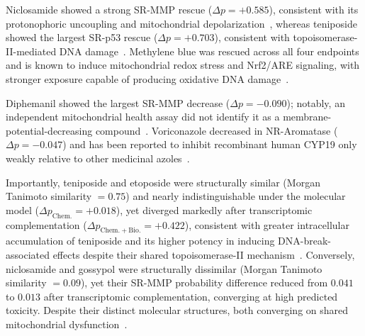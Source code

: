 \documentclass[11pt,a4paper]{article}
\begin{document}
Niclosamide showed a strong SR-MMP rescue (\(\Delta p=+0.585\)), consistent with its protonophoric uncoupling and mitochondrial depolarization~\cite{kumar2018niclosamide}, whereas teniposide showed the largest SR-p53 rescue (\(\Delta p=+0.703\)), consistent with topoisomerase-II-mediated DNA damage~\cite{long1992teniposide}. Methylene blue was rescued across all four endpoints and is known to induce mitochondrial redox stress and Nrf2/ARE signaling, with stronger exposure capable of producing oxidative DNA damage~\cite{gureev2019methylene}.

Diphemanil showed the largest SR-MMP decrease (\(\Delta p=-0.090\)); notably, an independent mitochondrial health assay did not identify it as a membrane-potential-decreasing compound~\cite{zink2020ethanol}. Voriconazole decreased in NR-Aromatase (\(\Delta p=-0.047\)) and has been reported to inhibit recombinant human CYP19 only weakly relative to other medicinal azoles~\cite{trosken2004aromatase}.

Importantly, teniposide and etoposide were structurally similar (Morgan Tanimoto similarity \(=0.75\)) and nearly indistinguishable under the molecular model (\(\Delta p_{\mathrm{Chem.}}=+0.018\)), yet diverged markedly after transcriptomic complementation (\(\Delta p_{\mathrm{Chem.+Bio.}}=+0.422\)), consistent with greater intracellular accumulation of teniposide and its higher potency in inducing DNA-break-associated effects despite their shared topoisomerase-II mechanism~\cite{long1992teniposide,long1985dna}. Conversely, niclosamide and gossypol were structurally dissimilar (Morgan Tanimoto similarity \(=0.09\)), yet their SR-MMP probability difference reduced from \(0.041\) to \(0.013\) after transcriptomic complementation, converging at high predicted toxicity. Despite their distinct molecular structures, both converging on shared mitochondrial dysfunction~\cite{kumar2018niclosamide,martinez1988gossypol}.

\clearpage
\end{document}
